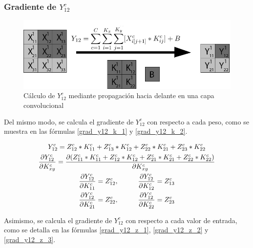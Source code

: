 \subsubsection{Gradiente de $Y^c_{12}$}

\begin{figure}[H]
	\centering
	\includegraphics[width=1\linewidth]{imagenes/conv_ejemplo_backprop_2.jpg} 
	\caption{Cálculo de $Y^c_{12}$ mediante propagación hacia delante en una capa convolucional}
	\label{fig:ejemplo_2_forward_prop_convolucional}
\end{figure}

Del mismo modo, se calcula el gradiente de $Y^c_{12}$ con respecto a cada peso, como se muestra en las fórmulas \ref{grad_y12_k_1} y \ref{grad_y12_k_2}.

\begin{gather}
	Y^c_{12} = Z^c_{12} * K^c_{11} + Z^c_{13} * K^c_{12} + Z^c_{22} * K^c_{21} + Z^c_{23} * K^c_{22} \\
	\frac{\partial Y^c_{12}}{\partial K^c_{xy}} = \frac{\partial (Z^c_{11} * K^c_{11} + Z^c_{12} * K^c_{12} + Z^c_{21} * K^c_{21} + Z^c_{22} * K^c_{22})}{\partial K^c_{xy}} \\
	\frac{\partial Y^c_{12}}{\partial K^c_{11}} = Z^c_{12}, \hspace{10mm} \frac{\partial Y^c_{12}}{\partial K^c_{12}} = Z^c_{13} \label{grad_y12_k_1} \\
	\frac{\partial Y^c_{12}}{\partial K^c_{21}} = Z^c_{22}, \hspace{10mm} \frac{\partial Y^c_{12}}{\partial K^c_{22}} = Z^c_{23} \label{grad_y12_k_2}
\end{gather}

Asimismo, se calcula el gradiente de $Y^c_{12}$ con respecto a cada valor de entrada, como se detalla en las fórmulas \ref{grad_y12_z_1}, \ref{grad_y12_z_2} y \ref{grad_y12_z_3}.

